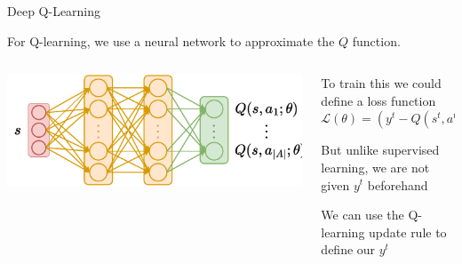 \begin{frame}[t]{Deep Q-Learning}

For  Q-learning, we use a neural network to approximate the $Q$ function.
\vspace{5pt}
\begin{columns}
    \begin{column}{0.4\textwidth}
    \vspace{0pt}%
        \includegraphics[width=\textwidth]{images/chapter_8/dqn_architecture.pdf}
    \end{column}\hfill
    \begin{column}{0.6\textwidth}
    \vspace{0pt}%
        \blist
            \item<1-> To train this we could define a loss function $\mathcal{L}(\theta) = \left(y^t - Q(s^t,a^t;\theta) \right)$
            \item<1-> But unlike supervised learning, we are not given $y^t$ beforehand
            \item <2->We can use the Q-learning update rule to define our $y^t$
        \elist
    \end{column}    
\end{columns}   


\end{frame}

